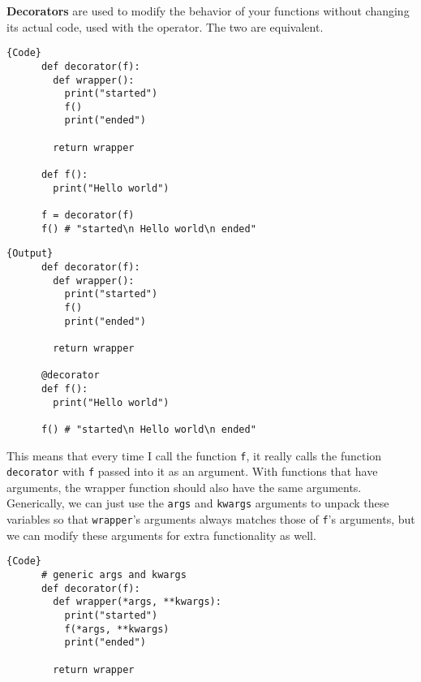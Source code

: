   \begin{definition}[Decorators]
    \textbf{Decorators} are used to modify the behavior of your functions without changing its actual code, used with the \texttt{\@} operator. The two are equivalent. 

    \noindent\begin{minipage}{.5\textwidth}
    \begin{lstlisting}[]{Code}
      def decorator(f): 
        def wrapper(): 
          print("started") 
          f()
          print("ended") 

        return wrapper

      def f(): 
        print("Hello world") 

      f = decorator(f)
      f() # "started\n Hello world\n ended"
    \end{lstlisting}
    \end{minipage}
    \hfill
    \begin{minipage}{.49\textwidth}
    \begin{lstlisting}[]{Output}
      def decorator(f): 
        def wrapper(): 
          print("started") 
          f()
          print("ended") 

        return wrapper

      @decorator
      def f(): 
        print("Hello world") 

      f() # "started\n Hello world\n ended"
    \end{lstlisting}
    \end{minipage}

    This means that every time I call the function \texttt{f}, it really calls the function \texttt{decorator} with \texttt{f} passed into it as an argument. With functions that have arguments, the wrapper function should also have the same arguments. Generically, we can just use the \texttt{\*args} and \texttt{\*\*kwargs} arguments to unpack these variables so that \texttt{wrapper}'s arguments always matches those of \texttt{f}'s arguments, but we can modify these arguments for extra functionality as well. 

    \noindent\begin{minipage}{.5\textwidth}
    \begin{lstlisting}[]{Code}
      # generic args and kwargs
      def decorator(f): 
        def wrapper(*args, **kwargs): 
          print("started") 
          f(*args, **kwargs)
          print("ended") 

        return wrapper


\end{lstlisting}
\end{minipage}
\end{definition}
